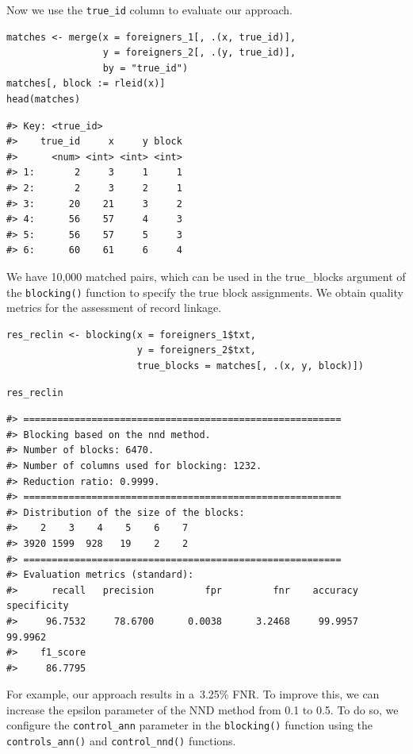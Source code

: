 Now we use the \texttt{true\_id} column to evaluate our approach.

\begin{verbatim}
matches <- merge(x = foreigners_1[, .(x, true_id)],
                 y = foreigners_2[, .(y, true_id)],
                 by = "true_id")
matches[, block := rleid(x)]
head(matches)
\end{verbatim}

\begin{verbatim}
#> Key: <true_id>
#>    true_id     x     y block
#>      <num> <int> <int> <int>
#> 1:       2     3     1     1
#> 2:       2     3     2     1
#> 3:      20    21     3     2
#> 4:      56    57     4     3
#> 5:      56    57     5     3
#> 6:      60    61     6     4
\end{verbatim}

We have 10,000 matched pairs, which can be used in the true\_blocks
argument of the \texttt{blocking()} function to specify the true block
assignments. We obtain quality metrics for the assessment of record
linkage.

\begin{verbatim}
res_reclin <- blocking(x = foreigners_1$txt,
                       y = foreigners_2$txt,
                       true_blocks = matches[, .(x, y, block)])
\end{verbatim}

\begin{verbatim}
res_reclin
\end{verbatim}

\begin{verbatim}
#> ========================================================
#> Blocking based on the nnd method.
#> Number of blocks: 6470.
#> Number of columns used for blocking: 1232.
#> Reduction ratio: 0.9999.
#> ========================================================
#> Distribution of the size of the blocks:
#>    2    3    4    5    6    7 
#> 3920 1599  928   19    2    2 
#> ========================================================
#> Evaluation metrics (standard):
#>      recall   precision         fpr         fnr    accuracy specificity 
#>     96.7532     78.6700      0.0038      3.2468     99.9957     99.9962 
#>    f1_score 
#>     86.7795
\end{verbatim}

For example, our approach results in a~3.25\% FNR. To improve this,
we can increase the epsilon parameter of the NND method from 0.1 to 0.5.
To do so, we configure the \texttt{control\_ann} parameter in the \texttt{blocking()}
function using the \texttt{controls\_ann()} and \texttt{control\_nnd()} functions.

